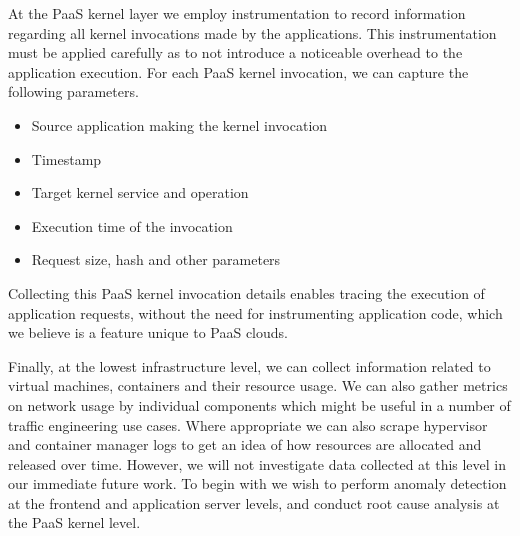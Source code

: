 At the PaaS kernel layer we employ instrumentation to record information regarding all kernel invocations
made by the applications. This instrumentation must be applied carefully as to not introduce a noticeable
overhead to the application execution. For each PaaS kernel invocation, we can capture the 
following parameters.
\begin{itemize}
\item Source application making the kernel invocation
\item Timestamp
\item Target kernel service and operation
\item Execution time of the invocation
\item Request size, hash and other parameters
\end{itemize}
Collecting this PaaS kernel invocation details enables tracing the execution of application 
requests, without the need for instrumenting application code, which we believe is a feature 
unique to PaaS clouds. 

Finally, at the lowest infrastructure level, we can collect information related to virtual machines, containers
and their resource usage. We can also gather metrics on network usage by individual components which
might be useful in a number of traffic engineering use cases. Where appropriate we can also scrape
hypervisor and container manager logs to get an idea of how resources are allocated and released over
time. However, we will not investigate data collected at this level in our immediate future work.
To begin with we wish to perform anomaly detection at the frontend and application server levels, and conduct
root cause analysis at the PaaS kernel level.

